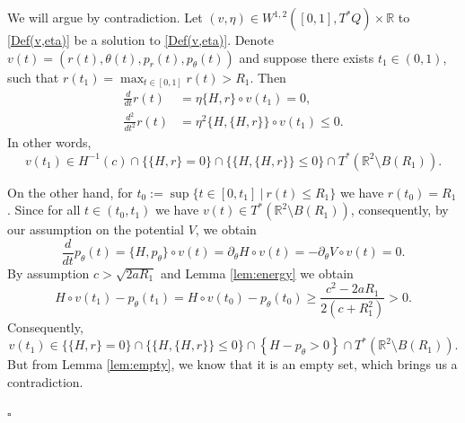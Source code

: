 \documentclass[a4paper]{amsart}
\numberwithin{equation}{section}
\newcommand{\R}{\mathbb{R}}
\begin{document}
We will argue by contradiction. Let $(v,\eta)\in W^{1,2}([0,1], T^*Q)\times\R$ to \eqref{Def(v,eta)} be a solution to \eqref{Def(v,eta)}. Denote $v(t)=(r(t), \theta(t), p_r(t), p_\theta(t))$ and suppose there exists $t_1 \in (0,1)$, such that $r(t_1)=\max_{t\in [0,1]}r(t)>R_1$. Then
\begin{equation}
\begin{aligned}
\frac{d}{dt} r(t)& =\eta \{H, r\}\circ v(t_1) = 0,\\ %
\frac{d^2}{dt^2}r(t) & =\eta^2\{H, \{H, r\}\}\circ v(t_1) \leq 0.
\end{aligned}
\end{equation}
In other words, 
$$
v(t_1)\in H^{-1}(c)\cap\{\{H,r\}=0\}\cap \{\{H,\{H,r\}\}\leq 0\}\cap T^*(\R^2\setminus B(R_1)).
$$

On the other hand, for $t_0:=\sup\{t \in [0, t_1]\ |\ r(t)\leq R_1\}$ we have $r(t_0)=R_1$. 
Since for all $t\in (t_0,t_1)$ we have $v(t)\in T^*(\R^2\setminus B(R_1))$, consequently, by our assumption on the potential $V$, we obtain 
$$
\frac{d}{dt}p_\theta(t)=\{H, p_\theta\}\circ v(t)= \partial_\theta H \circ v(t)= -\partial_\theta V \circ v(t)=0.
$$
By assumption $c>\sqrt{2aR_1}$ and Lemma \ref{lem:energy} we obtain
$$
H\circ v(t_1)-p_\theta(t_1)= H\circ v(t_0)-p_\theta(t_0) \geq \frac{c^2-2aR_1}{2(c+R_1^2)}>0.
$$
Consequently,
$$
v(t_1)\in \{\{H,r\}=0\}\cap \{\{H,\{H,r\}\}\leq 0\}\cap \left\lbrace H-p_\theta >0 \right\rbrace\cap T^*(\R^2\setminus B(R_1)).
$$
But from Lemma \ref{lem:empty}, we know that it is an empty set, which brings us a contradiction.

\hfill $\square$
\end{document}
